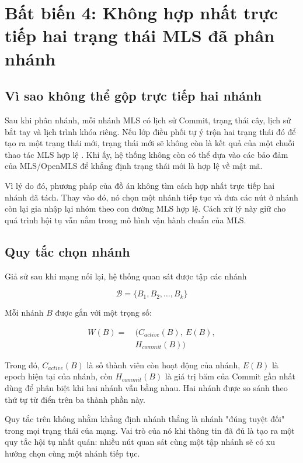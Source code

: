 \documentclass[../DoAn.tex]{subfiles}
\begin{document}
\section{Bất biến 4: Không hợp nhất trực tiếp hai trạng thái MLS đã phân nhánh}
\label{sec:bat_bien_khong_hop_nhat_truc_tiep}

\subsection{Vì sao không thể gộp trực tiếp hai nhánh}

Sau khi phân nhánh, mỗi nhánh MLS có lịch sử Commit, trạng thái cây, lịch sử bắt tay và lịch trình khóa riêng. Nếu lớp điều phối tự ý trộn hai trạng thái đó để tạo ra một trạng thái mới, trạng thái mới sẽ không còn là kết quả của một chuỗi thao tác MLS hợp lệ \cite{rfc9420}. Khi ấy, hệ thống không còn có thể dựa vào các bảo đảm của MLS/OpenMLS để khẳng định trạng thái mới là hợp lệ về mật mã.

Vì lý do đó, phương pháp của đồ án không tìm cách hợp nhất trực tiếp hai nhánh đã tách. Thay vào đó, nó chọn một nhánh tiếp tục và đưa các nút ở nhánh còn lại gia nhập lại nhóm theo con đường MLS hợp lệ. Cách xử lý này giữ cho quá trình hội tụ vẫn nằm trong mô hình vận hành chuẩn của MLS.

\subsection{Quy tắc chọn nhánh}

Giả sử sau khi mạng nối lại, hệ thống quan sát được tập các nhánh

\[
\mathcal{B} = \{B_1, B_2, \dots, B_k\}
\]

Mỗi nhánh $B$ được gắn với một trọng số:

\begin{equation}
	\label{eq:branch_weight_analysis}
	\begin{split}
		W(B) =\ & (C_{active}(B),\ E(B), \\
		        & H_{commit}(B))
	\end{split}
\end{equation}

Trong đó, $C_{active}(B)$ là số thành viên còn hoạt động của nhánh, $E(B)$ là epoch hiện tại của nhánh, còn $H_{commit}(B)$ là giá trị băm của Commit gần nhất dùng để phân biệt khi hai nhánh vẫn bằng nhau. Hai nhánh được so sánh theo thứ tự từ điển trên ba thành phần này.

Quy tắc trên không nhằm khẳng định nhánh thắng là nhánh "đúng tuyệt đối" trong mọi trạng thái của mạng. Vai trò của nó khi thông tin đã đủ là tạo ra một quy tắc hội tụ nhất quán: nhiều nút quan sát cùng một tập nhánh sẽ có xu hướng chọn cùng một nhánh tiếp tục.
\end{document}
